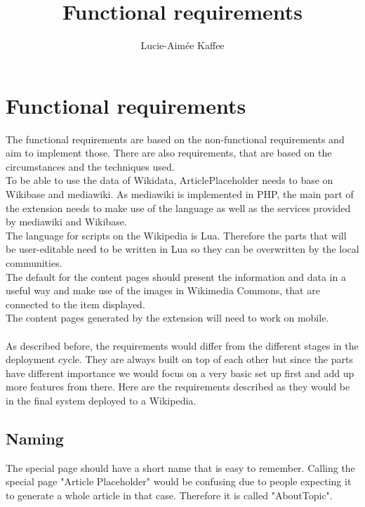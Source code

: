 \documentclass[11pt]{article}
\title {{Functional requirements}}
\author {Lucie-Aim\'{e}e Kaffee}
\date{}
\begin{document}
\listoftodos

\section {Functional requirements}
The functional requirements are based on the non-functional requirements and aim to implement those.
There are also requirements, that are based on the circumstances and the techniques used. \\
To be able to use the data of Wikidata, ArticlePlaceholder needs to base on Wikibase and mediawiki.
As mediawiki is implemented in PHP, the main part of the extension needs to make use of the language as well as the services provided by mediawiki and Wikibase. \\
The language for scripts on the Wikipedia is Lua. Therefore the parts that will be user-editable need to be written in Lua so they can be overwritten by the local communities. \\
The default for the content pages should present the information and data in a useful way and make use of the images in Wikimedia Commons, that are connected to the item displayed.\\
The content pages generated by the extension will need to work on mobile. \\
\\
As described before, the requirements would differ from the different stages in the deployment cycle. They are always built on top of each other but since the parts have different importance we would focus on a very basic set up first and add up more features from there. Here are the requirements described as they would be in the final system deployed to a Wikipedia.

%

\subsection{Naming}
The special page should have a short name that is easy to remember. Calling the special page "Article Placeholder" would be confusing due to people expecting it to generate a whole article in that case. Therefore it is called "AboutTopic".
\end{document}
